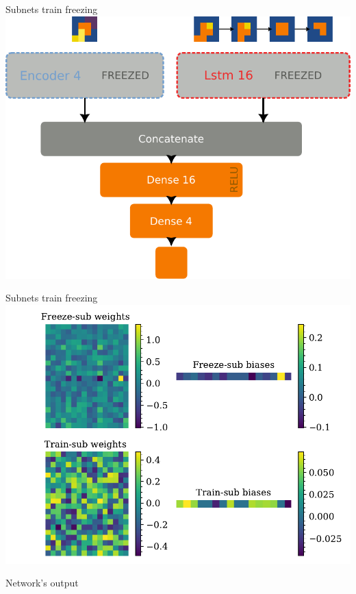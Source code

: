 \documentclass{beamer}
\begin{document}

    


\begin{frame}{Subnets train freezing}
    \includegraphics[width=.8\linewidth]{figures/freezetraining_2.pdf}
\end{frame}

\begin{frame}{Subnets train freezing}
    \includegraphics[width=.8\linewidth]{figures/freezetraining.pdf}
\end{frame}

\begin{frame}[fragile]{Network's output}


    
\end{frame}
\end{document}
